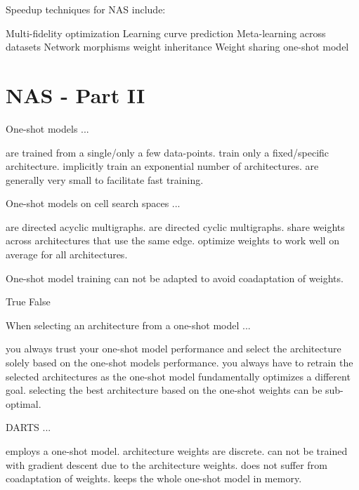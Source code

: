 \documentclass{exam}
\begin{document}
\begin{questions}
\question Speedup techniques for NAS include:
\begin{choices} %
    \choice Multi-fidelity optimization
    \choice Learning curve prediction
    \choice Meta-learning across datasets
    \choice Network morphisms
    \choice weight inheritance
    \choice Weight sharing
    \choice one-shot model
\end{choices}


\clearpage
\section{NAS - Part II}
\question One-shot models ...
\begin{choices}
    \choice are trained from a single/only a few data-points.
    \choice train only a fixed/specific architecture.
    \choice implicitly train an exponential number of architectures. %
    \choice are generally very small to facilitate fast training.
\end{choices}

\question One-shot models on cell search spaces ...
\begin{choices}
    \choice are directed acyclic multigraphs. %
    \choice are directed cyclic multigraphs.
    \choice share weights across architectures that use the same edge. %
    \choice optimize weights to work well on average for all architectures. %
\end{choices}

\question One-shot model training can not be adapted to avoid coadaptation of weights.
\begin{choices}
    \choice True
    \choice False
\end{choices}

\question When selecting an architecture from a one-shot model ...
\begin{choices}
    \choice you always trust your one-shot model performance and select the architecture solely based on the one-shot models performance.
    \choice you always have to retrain the selected architectures as the one-shot model fundamentally optimizes a different goal.
    \choice selecting the best architecture based on the one-shot weights can be sub-optimal. %
\end{choices}

\question DARTS ...
\begin{choices}
    \choice employs a one-shot model. %
    \choice architecture weights are discrete.
    \choice can not be trained with gradient descent due to the architecture weights.
    \choice does not suffer from coadaptation of weights.
    \choice keeps the whole one-shot model in memory. %
\end{choices}


\end{questions}
\end{document}
